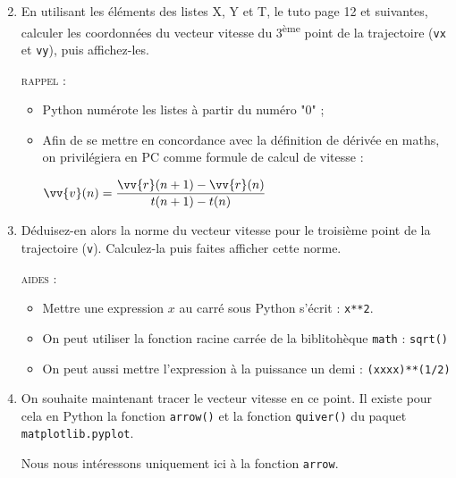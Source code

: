 \documentclass[11pt]{article}
\begin{document}
\begin{enumerate}
\setcounter{enumi}{1}
 \item En utilisant les éléments des listes X, Y et T, le tuto page 12 et suivantes, calculer les coordonnées du vecteur vitesse du 3\textsuperscript{ème} point de la trajectoire (\texttt{vx} et \texttt{vy}), puis affichez-les.
 
 \textsc{rappel :} 
 
 \begin{itemize}
  \item Python numérote les listes à partir du numéro "0" ;
  \item Afin de se mettre en concordance avec la définition de dérivée en maths, on privilégiera en PC comme formule de calcul de vitesse : 
  
  \begin{center}
$\vv{v}(n) = \dfrac{\vv{r}(n+1)-\vv{r}(n)}{t(n+1)-t(n)}$                                             \end{center}

 \end{itemize}


\item Déduisez-en alors la norme du vecteur vitesse pour le troisième point de la trajectoire (\texttt{v}). Calculez-la puis faites afficher cette norme.
 
 
 
 \textsc{aides :}
 \begin{itemize}
 \item Mettre une expression $x$ au carré sous Python s'écrit : \texttt{x**2}.
  \item On peut utiliser la fonction racine carrée de la biblitohèque \texttt{math} : \texttt{sqrt()}
  \item On peut aussi mettre l'expression à la puissance un demi : \texttt{(xxxx)**(1/2)}
 \end{itemize}
 

 
 \item On souhaite maintenant tracer le vecteur vitesse en ce point. Il existe pour cela en Python la fonction \texttt{arrow()} et la fonction \texttt{quiver()} du paquet \texttt{matplotlib.pyplot}. 
 
 Nous nous intéressons uniquement ici à la fonction \texttt{arrow}.
 
 
 \medskip
 
\end{enumerate}
\end{document}
